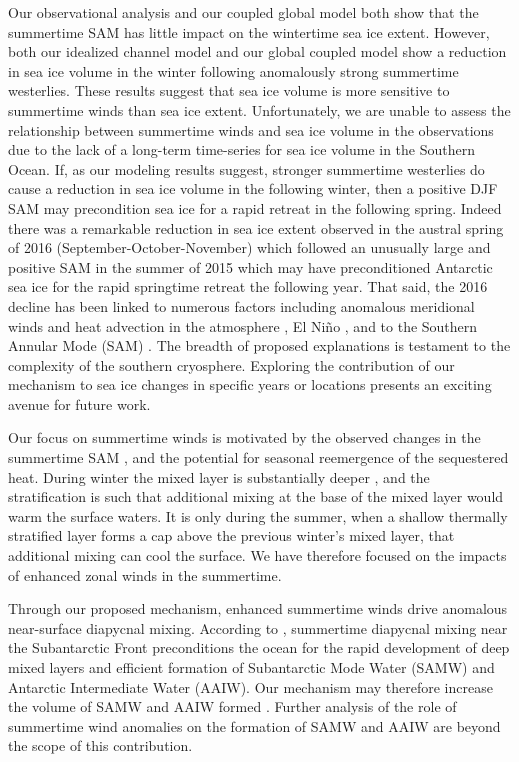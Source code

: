 \documentclass{ametsocV5}
\begin{document}
Our observational analysis and our coupled global model both show that the summertime SAM has  little impact on the wintertime sea ice extent. However, both our idealized channel model and our global coupled model show a reduction in sea ice volume in the winter following anomalously strong summertime westerlies. These results suggest that sea ice volume is more sensitive to summertime winds than sea ice extent. Unfortunately, we are unable to assess the relationship between summertime winds and sea ice volume in the observations due to the lack of a long-term time-series for sea ice volume in the Southern Ocean. If, as our modeling results suggest, stronger summertime westerlies do cause a reduction in sea ice volume in the following winter, then a positive DJF SAM may precondition sea ice for a rapid retreat in the following spring. Indeed there was a remarkable reduction in sea ice extent observed in the austral spring of 2016 (September-October-November) \citep{Jones2016,Parkinson2012,Scambos2018} which followed an unusually large and positive SAM in the summer of 2015 which may have preconditioned Antarctic sea ice for the rapid springtime retreat the following year. That said, the 2016 decline has been linked to numerous factors including anomalous meridional winds and heat advection in the atmosphere \citep{Schlosser2017}, El Ni\~no \citep{Stuecker2017}, and to the Southern Annular Mode (SAM) \citep{Doddridge2017}. The breadth of proposed explanations is testament to the complexity of the southern cryosphere. Exploring the contribution of our mechanism to sea ice changes in specific years or locations presents an exciting avenue for future work.

Our focus on summertime winds is motivated by the observed changes in the summertime SAM \citep{Marshall2003a}, and the potential for seasonal reemergence of the sequestered heat. During winter the mixed layer is substantially deeper \citep{Holte2017}, and the stratification is such that additional mixing at the base of the mixed layer would warm the surface waters. It is only during the summer, when a shallow thermally stratified layer forms a cap above the previous winter's mixed layer, that additional mixing can cool the surface. We have therefore focused on the impacts of enhanced zonal winds in the summertime.

Through our proposed mechanism, enhanced summertime winds drive anomalous near-surface diapycnal mixing. According to \citet{Sloyan2010}, summertime diapycnal mixing near the Subantarctic Front preconditions the ocean for the rapid development of deep mixed layers and efficient formation of Subantarctic Mode Water (SAMW) and Antarctic Intermediate Water (AAIW). Our mechanism may therefore increase the volume of SAMW and AAIW formed \citep[c.f.][]{Gao2018}. Further analysis of the role of summertime wind anomalies on the formation of SAMW and AAIW are beyond the scope of this contribution.
\end{document}
